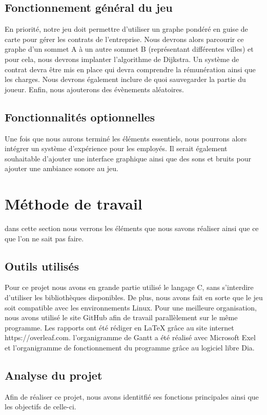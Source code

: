 \documentclass[a4paper, 12pt]{article}
\begin{document}
      \subsection{Fonctionnement général du jeu}
        En priorité, notre jeu doit permettre d'utiliser un graphe pondéré en guise de carte pour gérer les contrats de l'entreprise. Nous devrons alors parcourir ce graphe d'un sommet A à un autre sommet B (représentant différentes villes) et pour cela, nous devrons implanter l'algorithme de Dijkstra. Un système de contrat devra être mis en place qui devra comprendre la rémunération ainsi que les charges. Nous devrons également inclure de quoi sauvegarder la partie du joueur. Enfin, nous ajouterons des évènements aléatoires.
      \subsection{Fonctionnalités optionnelles}
       Une fois que nous aurons terminé les éléments essentiels, nous pourrons alors intégrer un système d'expérience pour les employés. Il serait également souhaitable d'ajouter une interface graphique ainsi que des sons et bruits pour ajouter une ambiance sonore au jeu.
\newpage
\section{Méthode de travail}
     dans cette section nous verrons les éléments que nous savons réaliser ainsi que ce que l'on ne sait pas faire.
      \subsection{Outils utilisés}
         Pour ce projet nous avons en grande partie utilisé le langage C, sans s'interdire d'utiliser les bibliothèques disponibles. De plus, nous avons fait en sorte que le jeu soit compatible avec les environnements Linux. Pour une meilleure organisation, nous avons utilisé le site GitHub afin de travail parallèlement sur le même programme.
         Les rapports ont été rédiger en LaTeX grâce au site internet https://overleaf.com. l'organigramme de Gantt a été réalisé avec Microsoft Exel et l'organigramme de fonctionnement du programme grâce au logiciel libre Dia.
    \subsection{Analyse du projet}
        Afin de réaliser ce projet, nous avons identitfié ses fonctions principales ainsi que les objectifs de celle-ci.
\end{document}
